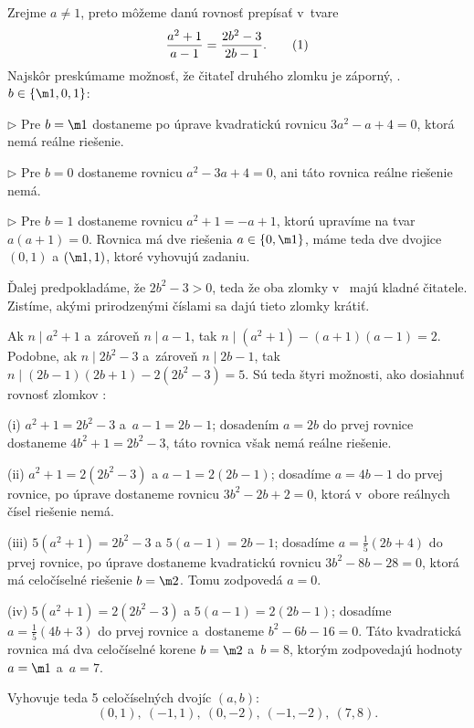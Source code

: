 {%
Zrejme $a\ne1$, preto môžeme danú rovnosť prepísať v~tvare
$$
\frac{a^2+1}{a-1}=\frac{2b^2-3}{2b-1}.
\tag1
$$
Najskôr preskúmame možnosť, že čitateľ druhého zlomku je záporný, \tj. $b\in\{\m1,0,1\}$:

\smallskip
\item{$\triangleright$}
Pre $b=\m1$ dostaneme po úprave kvadratickú rovnicu $3a^2-a+4=0$, ktorá nemá reálne riešenie.

\item{$\triangleright$}
Pre $b=0$ dostaneme rovnicu $a^2-3a+4=0$, ani táto rovnica reálne riešenie nemá.

\item{$\triangleright$}
Pre $b=1$ dostaneme rovnicu $a^2+1=-a+1$, ktorú upravíme na tvar $a(a+1)=0$. Rovnica má dve riešenia $a\in\{0,\m1\}$, máme teda dve dvojice $(0,1)$ a $(\m1,1)$, ktoré vyhovujú zadaniu.

\smallskip\noindent
Ďalej predpokladáme, že $2b^2-3>0$, teda že oba zlomky v~ majú kladné čitatele. Zistíme, akými prirodzenými číslami sa dajú tieto zlomky krátiť.

Ak $n\mid a^2+1$ a~zároveň $n\mid a-1$, tak $n\mid (a^2+1)-(a+1)(a-1)=2$. Podobne, ak $n\mid 2b^2-3$ a~zároveň $n\mid 2b-1$, tak $n\mid (2b-1)(2b+1)-2(2b^2-3)=5$. Sú teda štyri možnosti, ako dosiahnuť rovnosť zlomkov :

\smallskip
\item{(i)}
$a^2+1=2b^2-3$ a~$a-1=2b-1$; dosadením $a=2b$ do prvej rovnice dostaneme $4b^2+1=2b^2-3$, táto rovnica však nemá
reálne riešenie.

\item{(ii)}
$a^2+1=2(2b^2-3)$ a $a-1=2(2b-1)$; dosadíme $a=4b-1$ do prvej rovnice, po úprave dostaneme rovnicu $3b^2-2b+2=0$,
ktorá v~obore reálnych čísel riešenie nemá.

\item{(iii)}
$5(a^2+1)=2b^2-3$ a $5(a-1)=2b-1$; dosadíme $a=\frac15(2b+4)$ do prvej rovnice, po úprave dostaneme
kvadratickú rovnicu $3b^2-8b-28=0$, ktorá má celočíselné riešenie $b=\m2$. Tomu zodpovedá $a=0$.

\item{(iv)}
$5(a^2+1)=2(2b^2-3)$ a $5(a-1)=2(2b-1)$; dosadíme $a=\frac15(4b+3)$ do prvej rovnice a~dostaneme
$b^2-6b-16=0$. Táto kvadratická rovnica má dva celočíselné korene $b=\m2$ a~$b=8$, ktorým zodpovedajú hodnoty $a=\m1$ a~$a=7$.

\smallskip\noindent
Vyhovuje teda 5 celočíselných dvojíc $(a,b)$:
$$
(0,1),\ (-1,1),\ (0,-2),\ (-1,-2),\ (7,8).
$$

}
